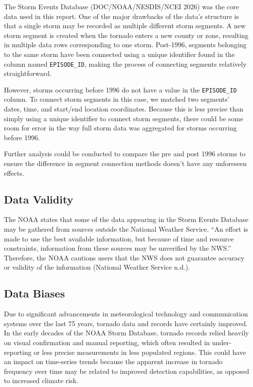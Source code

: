 \documentclass[
  letterpaper,
  DIV=11,
  numbers=noendperiod]{scrreprt}
\begin{document}
The Storm Events Database (DOC/NOAA/NESDIS/NCEI 2026) was the core data
used in this report. One of the major drawbacks of the data's structure
is that a single storm may be recorded as multiple different storm
segments. A new storm segment is created when the tornado enters a new
county or zone, resulting in multiple data rows corresponding to one
storm. Post-1996, segments belonging to the same storm have been
connected using a unique identifier found in the column named
\texttt{EPISODE\_ID}, making the process of connecting segments
relatively straightforward.

However, storms occurring before 1996 do not have a value in the
\texttt{EPISODE\_ID} column. To connect storm segments in this case, we
matched two segments' dates, time, and start/end location coordinates.
Because this is less precise than simply using a unique identifier to
connect storm segments, there could be some room for error in the way
full storm data was aggregated for storms occurring before 1996.

Further analysis could be conducted to compare the pre and post 1996
storms to ensure the difference in segment connection methods doesn't
have any unforeseen effects.

\subsection{Data Validity}\label{data-validity}

The NOAA states that some of the data appearing in the Storm Events
Database may be gathered from sources outside the National Weather
Service. ``An effort is made to use the best available information, but
because of time and resource constraints, information from these sources
may be unverified by the NWS.'' Therefore, the NOAA cautions users that
the NWS does not guarantee accuracy or validity of the information
(National Weather Service n.d.).

\subsection{Data Biases}\label{data-biases}

Due to significant advancements in meteorological technology and
communication systems over the last 75 years, tornado data and records
have certainly improved. In the early decades of the NOAA Storm
Database, tornado records relied heavily on visual confirmation and
manual reporting, which often resulted in under-reporting or less
precise measurements in less populated regions. This could have an
impact on time-series trends because the apparent increase in tornado
frequency over time may be related to improved detection capabilities,
as opposed to increased climate risk.
\end{document}
